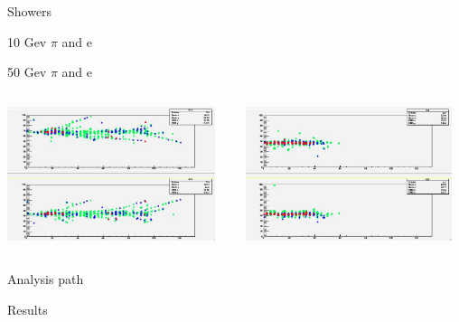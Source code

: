 \documentclass[10pt]{beamer}
\begin{document}
\begin{frame}{Showers}
\begin{block}{10 Gev $\pi$ and e}
  \end{block}
  \begin{block}{50 Gev $\pi$ and e}
    \begin{columns}
      \begin{column}{0.5\textwidth}
        \centerline{\includegraphics[width=0.95\textwidth]{jpg/50GevPion.jpg}}
      \end{column}
      \begin{column}{0.5\textwidth}
        \centerline{\includegraphics[width=0.95\textwidth]{jpg/50GevElectron.jpg}}
      \end{column}
    \end{columns}

  \end{block}

\end{frame}

\begin{frame}{Analysis path}
\end{frame}
\begin{frame}{Results}
\end{frame}
\end{document}
